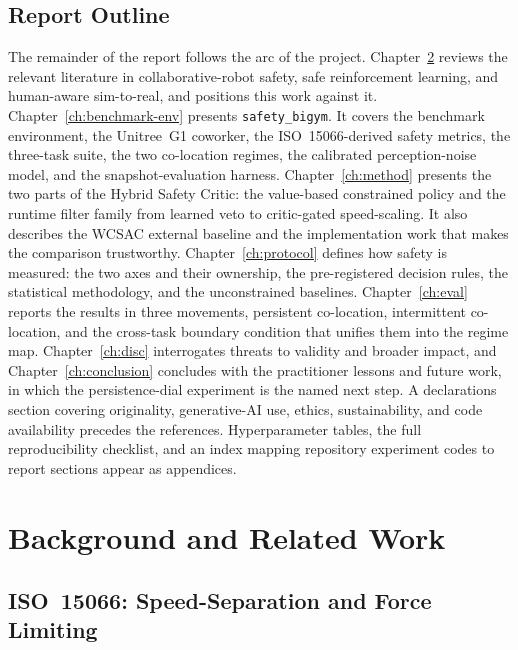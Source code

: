 \documentclass[11pt,a4paper]{report}
\newcommand{\iso}{ISO~15066}
\newcommand{\sbigym}{\texttt{safety\_bigym}}
\begin{document}
\section{Report Outline}
\label{sec:intro:outline}

The remainder of the report follows the arc of the project.
Chapter~\ref{ch:background} reviews the relevant literature in
collaborative-robot safety, safe reinforcement learning, and
human-aware sim-to-real, and positions this work against it.
Chapter~\ref{ch:benchmark-env} presents \sbigym{}. It covers the
benchmark environment, the Unitree~G1 coworker, the \iso{}-derived
safety metrics, the three-task suite, the two co-location regimes, the
calibrated perception-noise model, and the snapshot-evaluation
harness. Chapter~\ref{ch:method} presents the two parts of the Hybrid
Safety Critic: the value-based constrained policy and the runtime
filter family from learned veto to critic-gated speed-scaling. It also
describes the WCSAC external baseline and the implementation work that
makes the comparison trustworthy.
Chapter~\ref{ch:protocol} defines how safety is measured: the two
axes and their ownership, the pre-registered decision rules, the
statistical methodology, and the unconstrained baselines.
Chapter~\ref{ch:eval} reports the results in three movements,
persistent co-location, intermittent co-location, and the cross-task
boundary condition that unifies them into the regime map.
Chapter~\ref{ch:disc} interrogates threats to validity and broader
impact, and Chapter~\ref{ch:conclusion} concludes with the
practitioner lessons and future work, in which the persistence-dial
experiment is the named next step. A declarations section covering
originality, generative-AI use, ethics, sustainability, and code
availability precedes the references. Hyperparameter tables, the full
reproducibility checklist, and an index mapping repository
experiment codes to report sections appear as appendices.


\chapter{Background and Related Work}
\label{ch:background}

\section{\iso{}: Speed-Separation and Force Limiting}
\label{sec:bg:iso}
\end{document}
